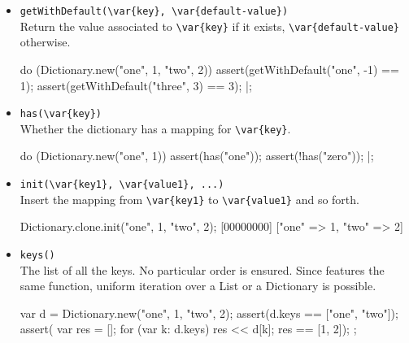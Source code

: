 \begin{itemize}
\begin{urbiscript}
assert(Dictionary.new("one", 1, "two", 2).get("one") == 1);
try
{
  Dictionary.new("one", 1, "two", 2).get("three");
  echo("never reached");
}
catch (var e if e.isA(Dictionary.KeyError))
{
  assert(e.key == "three")
};
\end{urbiscript}


\item \lstinline|getWithDefault(\var{key}, \var{default-value})|\\
  Return the value associated to  \lstinline|\var{key}| if it exists,
  \lstinline|\var{default-value}| otherwise.

\begin{urbiscript}
do (Dictionary.new("one", 1, "two", 2))
{
  assert(getWithDefault("one",  -1) == 1);
  assert(getWithDefault("three", 3) == 3);
}|;
\end{urbiscript}


\item \lstinline|has(\var{key})|\\
  Whether the dictionary has a mapping for \lstinline|\var{key}|.

\begin{urbiscript}
do (Dictionary.new("one", 1))
{
  assert(has("one"));
  assert(!has("zero"));
}|;
\end{urbiscript}

\item \lstinline|init(\var{key1}, \var{value1}, ...)|~\\
  Insert the mapping from \lstinline|\var{key1}| to
  \lstinline|\var{value1}| and so forth.

\begin{urbiscript}
Dictionary.clone.init("one", 1, "two", 2);
[00000000] ["one" => 1, "two" => 2]
\end{urbiscript}

\item \lstinline|keys()|\\
  The list of all the keys.  No particular order is ensured.  Since
   features the same function, uniform iteration over
  a List or a Dictionary is possible.
\begin{urbiscript}
{
  var d = Dictionary.new("one", 1, "two", 2);
  assert(d.keys == ["one", "two"]);
  assert({
           var res = [];
           for (var k: d.keys)
             res << d[k];
           res
         }
         == [1, 2]);
};
\end{urbiscript}


\end{itemize}
